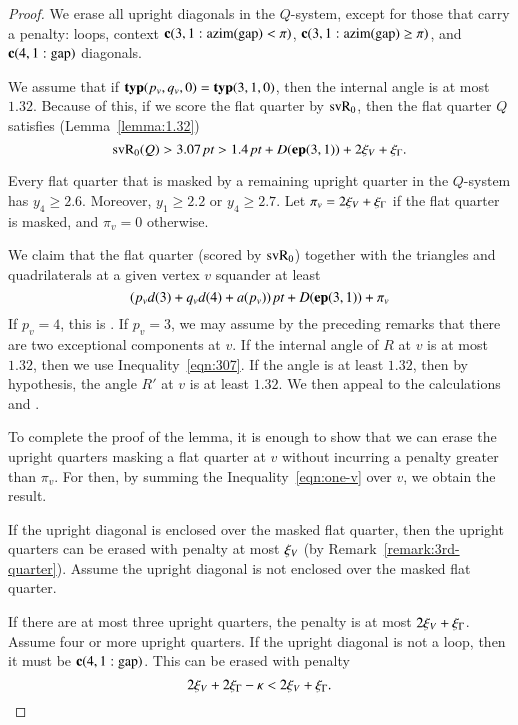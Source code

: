 \begin{proof}   We erase all upright diagonals in the
$Q$-system, except for those that carry a penalty: loops,
context ${\operatorname{\bf c}}{(3,1: {\operatorname{azim}}({\operatorname{gap}}) <\pi)}$, ${\operatorname{\bf c}}{(3,1: {\operatorname{azim}}({\operatorname{gap}}) \ge \pi)}$, and ${\operatorname{\bf c}}{(4,1:{\operatorname{gap}})}$ diagonals.

We assume that if ${\operatorname{\bf typ}}{(p_v,q_v,0)}={\operatorname{\bf typ}}{(3,1,0)}$, then the internal angle is at
most $1.32$. Because of this, if we score the flat quarter by
${\operatorname{svR}}_0$, then the flat quarter $Q$ satisfies
(Lemma~\ref{lemma:1.32})
   \begin{equation}
   {\operatorname{svR}}_0(Q) > 3.07\,\hbox{\it pt} > 1.4\,\hbox{\it pt} + D({\operatorname{\bf ep}}{(3,1)}) + 2\xi_V + \xi_\Gamma.
   \label{eqn:307}
   \end{equation}



Every flat quarter that is masked by a remaining upright quarter
in the $Q$-system has $y_4\ge2.6$.  Moreover, $y_1\ge2.2$ or
$y_4\ge2.7$.  Let $\pi_v = 2\xi_V + \xi_\Gamma$ if the flat quarter is
masked, and $\pi_v = 0$ otherwise.

We claim that the flat quarter (scored by ${\operatorname{svR}}_0$) together with
the triangles and quadrilaterals at a given vertex $v$ squander at
least
   \begin{equation}
   (p_v d(3) + q_v d(4) + a(p_v))\,\hbox{\it pt} + D({\operatorname{\bf ep}}{(3,1)}) + \pi_v
   \label{eqn:one-v}
   \end{equation}
If $p_v=4$, this is .  If $p_v=3$, we may assume
by the preceding remarks that there are two exceptional components at
$v$.  If the internal angle of $R$ at $v$ is at most $1.32$, then
we use Inequality~\ref{eqn:307}.  If the angle is at least $1.32$,
then by hypothesis, the angle $R'$ at $v$ is at least $1.32$.  We
then appeal to the calculations  and
.

To complete the proof of the lemma, it is enough to show that we
can erase the upright quarters masking a flat quarter at $v$
without incurring a penalty greater than $\pi_v$.  For then, by
summing the Inequality~\ref{eqn:one-v} over $v$, we obtain the
result.

If the upright diagonal is enclosed over the masked flat quarter,
then the upright quarters can be erased with penalty at most
$\xi_V$ (by Remark~\ref{remark:3rd-quarter}). Assume the upright
diagonal is not enclosed over the masked flat quarter.

If there are at most three upright quarters, the penalty is at
most $2\xi_V + \xi_\Gamma$.  Assume four or more upright quarters.  If
the upright diagonal is not a loop, then it must be ${\operatorname{\bf c}}{(4,1:{\operatorname{gap}})}$.
This can be erased with penalty
   $$2\xi_V + 2\xi_\Gamma - \kappa < 2\xi_V + \xi_\Gamma.$$


\end{proof}
